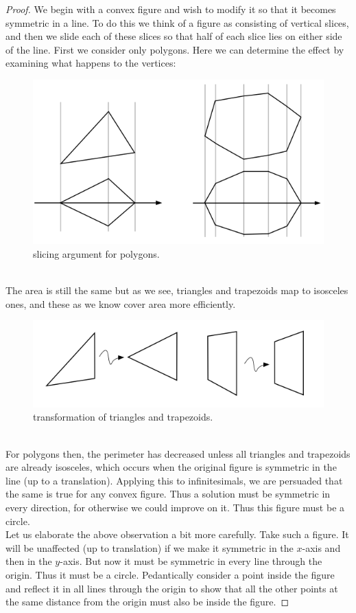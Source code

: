 \documentclass[12pt, a4paper, titlepage]{article}
\begin{document}
\begin{proof}
We begin with a convex figure and wish to modify it so that it becomes symmetric in a line. To do this we think of a figure as consisting of vertical slices, and then we slide each of these slices so that half of each slice lies on either side of the line. First we consider only polygons. Here we can determine the effect by examining what happens to the vertices: 
\begin{figure}[htbp]
\includegraphics[scale=0.5]{images/Figure6}
\centering
\caption{slicing argument for polygons.}
\end{figure}
\\
The area is still the same but as we see, triangles and trapezoids map to isosceles ones, and these as we know cover area more efficiently.
\begin{figure}[htbp]
\includegraphics[scale=0.5]{images/Figure7}
\centering
\caption{transformation of triangles and trapezoids.}
\end{figure}
\\
For polygons then, the perimeter has decreased unless all triangles and trapezoids are already isosceles, which occurs when the original figure is symmetric in the line (up to a translation). Applying this to infinitesimals, we are persuaded that the same is true for any convex figure. Thus a solution must be symmetric in every direction, for otherwise we could improve on it. Thus this figure must be a circle. \\
Let us elaborate the above observation a bit more carefully. Take such a figure. It will be unaffected (up to translation) if we make it symmetric in the $x$-axis and then in the $y$-axis. But now it must be symmetric in every line through the origin. Thus it must be a circle. Pedantically consider a point inside the figure and reflect it in all lines through the origin to show that all the other points at the same distance from the origin must also be inside the figure.
\end{proof}
\end{document}
